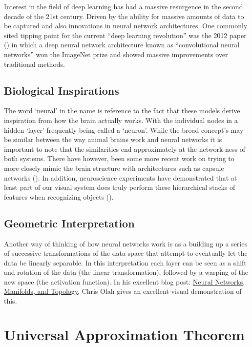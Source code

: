 \documentclass[]{book}
\theoremstyle{definition}
\theoremstyle{definition}
\theoremstyle{definition}
\theoremstyle{remark}
\begin{document}
Interest in the field of deep learning has had a massive resurgence in
the second decade of the 21st century. Driven by the ability for massive
amounts of data to be captured and also innovations in neural network
architectures. One commonly sited tipping point for the current ``deep
learning revolution'' was the 2012 paper (\citet{imagenet_2012}) in
which a deep neural network architecture known as ``convolutional neural
networks'' won the ImageNet prize and showed massive improvements over
traditional methods.

\subsection{Biological Inspirations}\label{biological-inspirations}

The word `neural' in the name is reference to the fact that these models
derive inspiration from how the brain actually works. With the
individual nodes in a hidden `layer' frequently being called a `neuron'.
While the broad concept's may be similar between the way animal brains
work and neural networks it is important to note that the similarities
end approximately at the network-ness of both systems. There have
however, been some more recent work on trying to more closely mimic the
brain structure with architectures such as capsule networks
(\citet{capsnet}). In addition, neuroscience experiments have
demonstrated that at least part of our visual system does truly perform
these hierarchical stacks of features when recognizing objects
(\citet{cnn_animals}).

\subsection{Geometric Interpretation}\label{geometric-interpretation}

Another way of thinking of how neural networks work is as a building up
a series of successive transformations of the data-space that attempt to
eventually let the data be linearly separable. In this interpretation
each layer can be seen as a shift and rotation of the data (the linear
transformation), followed by a warping of the new space (the activation
function). In his excellent blog post:
\href{http://colah.github.io/posts/2014-03-NN-Manifolds-Topology/}{Neural
Networks, Manifolds, and Topology}, Chris Olah gives an excellent visual
demonstration of this.

\section{Universal Approximation
Theorem}\label{universal-approximation-theorem}
\end{document}
